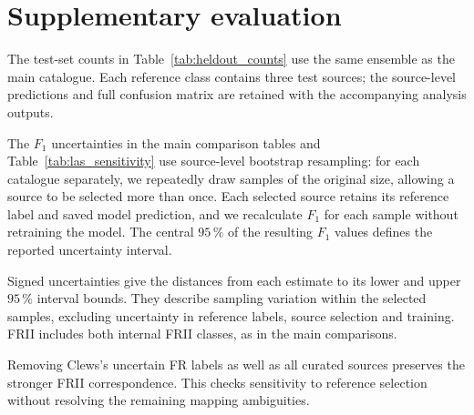 \begingroup
{}
\section{Supplementary evaluation}
\label{app:evaluation}

The test-set counts in Table~\ref{tab:heldout_counts} use the same ensemble as the main catalogue. Each reference class contains three test sources; the source-level predictions and full confusion matrix are retained with the accompanying analysis outputs.

\begin{table}[H]
\centering
\small
{}

\caption[Test-set classification counts]{Predictions for the \(33\) test sources.}
\label{tab:heldout_counts}
\end{table}

The \(F_1\) uncertainties in the main comparison tables and Table~\ref{tab:las_sensitivity} use source-level bootstrap resampling: for each catalogue separately, we repeatedly draw samples of the original size, allowing a source to be selected more than once. Each selected source retains its reference label and saved model prediction, and we recalculate \(F_1\) for each sample without retraining the model. The central \(95\,\%\) of the resulting \(F_1\) values defines the reported uncertainty interval.

Signed uncertainties give the distances from each estimate to its lower and upper \(95\,\%\) interval bounds. They describe sampling variation within the selected samples, excluding uncertainty in reference labels, source selection and training. FRII includes both internal FRII classes, as in the main comparisons.

\begin{table}[H]
\centering
\small
{}
\setlength{\tabcolsep}{5pt}
\renewcommand{\arraystretch}{1.6}

\caption[Angular-size sensitivity of external correspondence]{Curated-excluded comparisons by LAS, with \(95\,\%\) bootstrap intervals. Bins include their lower edge; the final bin includes \(1000''\).}
\label{tab:las_sensitivity}
\end{table}

Removing Clews's uncertain FR labels as well as all curated sources preserves the stronger FRII correspondence. This checks sensitivity to reference selection without resolving the remaining mapping ambiguities.
\par
\endgroup

